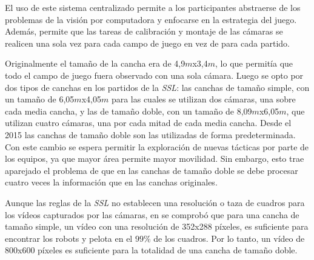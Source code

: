 El uso de este sistema centralizado permite a los participantes abstraerse de
los problemas de la visión por computadora y enfocarse en la estrategia del
juego. Además, permite que las tareas de calibración y montaje de las cámaras se
realicen una sola vez para cada campo de juego en vez de para cada partido.

Originalmente el tamaño de la cancha era de 4,9$m$x3,4$m$, lo que permitía que
todo el campo de juego fuera observado con una sola cámara. Luego se opto por
dos tipos de canchas en los partidos de la \emph{SSL}: las canchas de tamaño
simple, con un tamaño de 6,05$m$x4,05$m$ para las cuales se utilizan dos
cámaras, una sobre cada media cancha, y las de tamaño doble, con un tamaño de
8,09$m$x6,05$m$, que utilizan cuatro cámaras, una por cada mitad de cada media
cancha. Desde el 2015 las canchas de tamaño doble son las utilizadas de forma
predeterminada\cite{sslrules2015}. Con este cambio se espera permitir la
exploración de nuevas tácticas por parte de los equipos, ya que mayor área
permite mayor movilidad. Sin embargo, esto trae aparejado el problema de que en
las canchas de tamaño doble se debe procesar cuatro veces la información que en
las canchas originales.

Aunque las reglas de la \emph{SSL} no establecen una resolución o taza de
cuadros para los vídeos capturados por las cámaras, en \cite{torres2014} se
comprobó que para una cancha de tamaño simple, un vídeo con una resolución de
352x288 píxeles, es suficiente para encontrar los robots y pelota en el $99\%$
de los cuadros. Por lo tanto, un vídeo de 800x600 píxeles es suficiente para la
totalidad de una cancha de tamaño doble.
